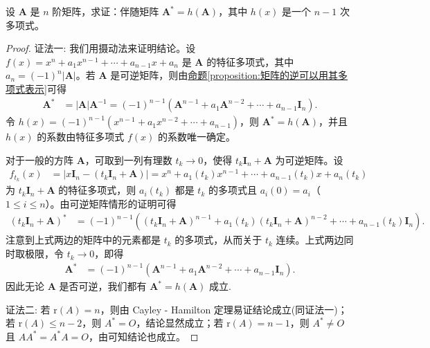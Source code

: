 \documentclass[../../main.tex]{subfiles}%
\begin{document}
\begin{proposition}\label{proposition:伴随矩阵可原矩阵的多项式表示}
设 \(\boldsymbol{A}\) 是 \(n\) 阶矩阵，求证：伴随矩阵 \(\boldsymbol{A}^* = h(\boldsymbol{A})\)，其中 \(h(x)\) 是一个 \(n - 1\) 次多项式。
\end{proposition}
\begin{proof}

{\color{blue}证法一:}
我们用摄动法来证明结论。设 \(f(x)=x^n + a_1x^{n - 1}+\cdots + a_{n - 1}x + a_n\) 是 \(\boldsymbol{A}\) 的特征多项式，其中 \(a_n = (-1)^n|\boldsymbol{A}|\)。若 \(\boldsymbol{A}\) 是可逆矩阵，则由\hyperref[proposition:矩阵的逆可以用其多项式表示]{命题\ref{proposition:矩阵的逆可以用其多项式表示}}可得
\begin{align*}
\boldsymbol{A}^*&=|\boldsymbol{A}|\boldsymbol{A}^{-1}=(-1)^{n - 1}(\boldsymbol{A}^{n - 1}+a_1\boldsymbol{A}^{n - 2}+\cdots + a_{n - 1}\boldsymbol{I}_n).
\end{align*}
令 \(h(x)=(-1)^{n - 1}(x^{n - 1}+a_1x^{n - 2}+\cdots + a_{n - 1})\)，则 \(\boldsymbol{A}^* = h(\boldsymbol{A})\)，并且 \(h(x)\) 的系数由特征多项式 \(f(x)\) 的系数唯一确定。

对于一般的方阵 \(\boldsymbol{A}\)，可取到一列有理数 \(t_k\rightarrow 0\)，使得 \(t_k\boldsymbol{I}_n+\boldsymbol{A}\) 为可逆矩阵。设
\begin{align*}
f_{t_k}(x)&=|x\boldsymbol{I}_n-(t_k\boldsymbol{I}_n+\boldsymbol{A})|=x^n + a_1(t_k)x^{n - 1}+\cdots + a_{n - 1}(t_k)x + a_n(t_k)
\end{align*}
为 \(t_k\boldsymbol{I}_n+\boldsymbol{A}\) 的特征多项式，则 \(a_i(t_k)\) 都是 \(t_k\) 的多项式且 \(a_i(0)=a_i\)（\(1\leqslant  i\leqslant  n\)）。由可逆矩阵情形的证明可得
\begin{align*}
(t_k\boldsymbol{I}_n+\boldsymbol{A})^*&=(-1)^{n - 1}\left((t_k\boldsymbol{I}_n+\boldsymbol{A})^{n - 1}+a_1(t_k)(t_k\boldsymbol{I}_n+\boldsymbol{A})^{n - 2}+\cdots + a_{n - 1}(t_k)\boldsymbol{I}_n\right).
\end{align*}
注意到上式两边的矩阵中的元素都是 \(t_k\) 的多项式，从而关于 \(t_k\) 连续。上式两边同时取极限，令 \(t_k\rightarrow 0\)，即得
\begin{align*}
\boldsymbol{A}^*&=(-1)^{n - 1}(\boldsymbol{A}^{n - 1}+a_1\boldsymbol{A}^{n - 2}+\cdots + a_{n - 1}\boldsymbol{I}_n).
\end{align*}
因此无论 \(\boldsymbol{A}\) 是否可逆，我们都有 \(\boldsymbol{A}^* = h(\boldsymbol{A})\) 成立.

{\color{blue}证法二:}
若 $\mathrm{r}(A)=n$，则由 Cayley - Hamilton 定理易证结论成立(同证法一)；若 $\mathrm{r}(A)\leqslant  n - 2$，则 $A^* = O$，结论显然成立；若 $\mathrm{r}(A)=n - 1$，则 $A^*\neq O$ 且 $AA^* = A^*A = O$，由可知结论也成立。
\end{proof}
\end{document}
